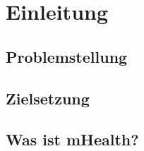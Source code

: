 \section{Einleitung}
\subsection{Problemstellung}
\subsection{Zielsetzung}
\subsection{Was ist mHealth?}